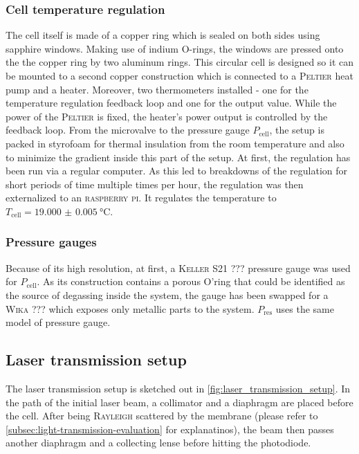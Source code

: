\documentclass[../thesis.tex]{subfiles}
\begin{document}
            \subsubsection{Cell temperature regulation}
            \label{subsec:tcell-regulation}

                The cell itself is made of a copper ring which is sealed on both sides using sapphire windows. Making use of indium O-rings, the windows are pressed onto the the copper ring by two aluminum rings. This circular cell is designed so it can be mounted to a second copper construction which is connected to a \textsc{Peltier} heat pump and a heater. Moreover, two thermometers installed - one for the temperature regulation feedback loop and one for the output value. While the power of the \textsc{Peltier} is fixed, the heater's power output is controlled by the feedback loop. From the microvalve to the pressure gauge $P_\mathrm{cell}$, the setup is packed in styrofoam for thermal insulation from the room temperature and also to minimize the gradient inside this part of the setup. At first, the regulation has been run via a regular computer. As this led to breakdowns of the regulation for short periods of time multiple times per hour,  the regulation was then externalized to an \textsc{raspberry pi}. It regulates the temperature to $T_\mathrm{cell}=\SI{19.000(5)}{\celsius}$.


            \subsubsection{Pressure gauges}

                Because of its high resolution, at first, a \textsc{Keller} S21 ??? pressure gauge was used for $P_\mathrm{cell}$. As its construction contains a porous O'ring that could be identified as the source of degassing inside the system, the gauge has been swapped for a \textsc{Wika} ??? which exposes only metallic parts to the system. $P_\mathrm{res}$ uses the same model of pressure gauge.


            \subsection{Laser transmission setup}
            \label{subsec:laser_transmission_setup}

              The laser transmission setup is sketched out in \cref{fig:laser_transmission_setup}. In the path of the initial laser beam, a collimator and a diaphragm are placed before the cell. After being \textsc{Rayleigh} scattered by the membrane (please refer to \cref{subsec:light-transmission-evaluation} for explanatinos), the beam then passes another diaphragm and a collecting lense before hitting the photodiode.
\end{document}
